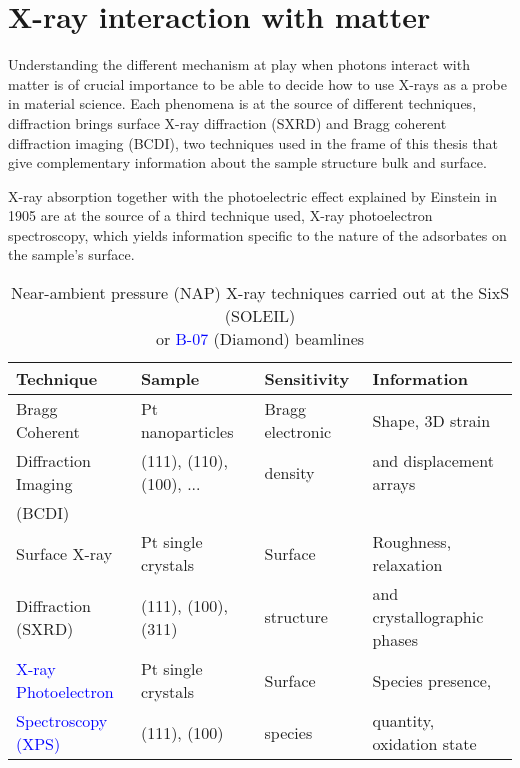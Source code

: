 \section{X-ray interaction with matter}

Understanding the different mechanism at play when photons interact with matter is of crucial importance to be able to decide how to use X-rays as a probe in material science.
Each phenomena is at the source of different techniques, diffraction brings surface X-ray diffraction (SXRD) and Bragg coherent diffraction imaging (BCDI), two techniques used in the frame of this thesis that give complementary information about the sample structure bulk and surface.

X-ray absorption together with the photoelectric effect explained by Einstein in 1905 are at the source of a third technique used, X-ray photoelectron spectroscopy, which yields information specific to the nature of the adsorbates on the sample's surface.

\begin{table}[!htb]
    \centering
    \small
    \begin{tabular}{l|l|l|l}
        Technique & Sample & Sensitivity & Information \\
        \toprule
        \textcolor{Important}{Bragg Coherent} & Pt nanoparticles & Bragg electronic & Shape, 3D strain  \\
        \textcolor{Important}{Diffraction Imaging} & (111), (110), (100), ... & density & and displacement arrays \\
        \textcolor{Important}{(BCDI)} &  &  & \\
        \midrule
        \textcolor{Important}{Surface X-ray} & Pt single crystals & Surface & Roughness, relaxation \\
        \textcolor{Important}{Diffraction (SXRD)} & (111), (100), (311) & structure & and crystallographic phases \\
        \midrule
        \textcolor{Blue}{X-ray Photoelectron} & Pt single crystals & Surface & Species presence, \\
        \textcolor{Blue}{Spectroscopy (XPS)} & (111), (100) & species & quantity, oxidation state \\
        \bottomrule
    \end{tabular}
    \caption{Near-ambient pressure (NAP) X-ray techniques carried out at the \textcolor{Important}{SixS} (SOLEIL) \\ or \textcolor{Blue}{B-07} (Diamond) beamlines}
    \label{tab:techniques}
\end{table}

